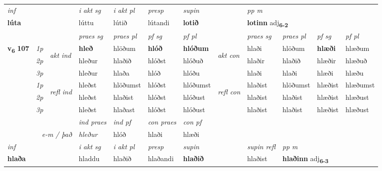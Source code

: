 \begin{longtable}[l]{X>{\footnotesize\itshape}llXXXXlXXXX}
   {\textit{inf}} & &  & \textit{i akt sg} & \textit{i akt pl}   & \textit{presp} & \textit{supin}  && \textit{pp m} \\*
  {\textbf{lúta}} & && lúttu  & lútið   & lútandi &  \textbf{lotið}  && \multicolumn{2}{l}{\textbf{lotinn} adj\textbf{\textsubscript{6-2}}} \\*

\midrule

 & &   & \textit{praes sg}  & \textit{praes pl}    & \textit{ pf sg} & \textit{pf pl} & & \textit{praes sg}  & \textit{praes pl}    & \textit{pf sg} & \textit{pf pl }  \\ \cmidrule{4-7} \cmidrule{9-12}
 \multirow{2}{*}{{{\textbf{v{\textsubscript{6}}} \Large{\textbf{107}}}}}  & 1p & \multirow{3}{*}{\begin{turn}{90}\textit{akt ind}\end{turn}} & \textbf{hleð} & hlöðum & \textbf{hlóð} & \textbf{hlóðum} & \multirow{3}{*}{\begin{turn}{90}\textit{akt con}\end{turn}} &hlaði & hlöðum & \textbf{hlæði} & hlæðum\\*
 & 2p &  &  hleður  & hlaðið & hlóðst & hlóðuð & & hlaðir & hlaðið & hlæðir & hlæðuð \\*
 & 3p &  & hleður & hlaða & hlóð & hlóðu & & hlaði & hlaði& hlæði & hlæðu \\*
\cmidrule{4-7} \cmidrule{9-12}
 & 1p & \multirow{3}{*}{\begin{turn}{90}\textit{refl ind}\end{turn}}  & hleðst & hlöðumst & hlóðst & hlóðumst & \multirow{3}{*}{\begin{turn}{90}\textit{refl con}\end{turn}}  &hlaðist & hlöðumst & hlæðist & hlæðumst \\*
 & 2p &  & hleðst & hlaðist & hlóðst & hlóðust & &hlaðist & hlaðist & hlæðist & hlæðust \\*
 & 3p  & & hleðst & hlaðast & hlóðst & hlóðust & & hlaðist & hlaðist& hlæðist & hlæðust \\*
\cmidrule{4-7} \cmidrule{9-12}

   && &  \textit{ind praes} & \textit{ind pf} & \textit{con praes} & \textit{con pf} \\*
\multicolumn{3}{r}{\textit{e-m / það}} & hleður & hlóð & hlaði & hlæði \\*

\cmidrule{4-7}
   {\textit{inf}} & &  & \textit{i akt sg} & \textit{i akt pl}   & \textit{presp} & \textit{supin} && \textit{supin refl} & \textit{pp m} \\*
  {\textbf{hlaða}} & && hladdu  & hlaðið   & hlaðandi &  \textbf{hlaðið} && hlaðist & \multicolumn{2}{l}{\textbf{hlaðinn} adj\textbf{\textsubscript{6-3}}} \\*


\end{longtable}

